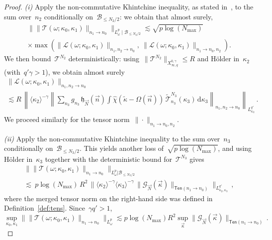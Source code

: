\documentclass[11pt,reqno,english]{amsart}
\numberwithin{equation}{section}
\theoremstyle{plain}
\theoremstyle{definition}
\theoremstyle{remark}
\begin{document}
\begin{proof}
	\emph{(i)} Apply the non-commutative Khintchine inequality, as stated in~\cite[(1.1)]{Kan25}, to the sum over~$n_{2}$ conditionally on~$\mathcal{B}_{\leq N_{2}/2}$: we obtain that almost surely,
	\begin{multline*}
		\Big\|
		\|\mathcal{T}(\omega;\kappa_{0},\kappa_{1})\|_{n_{1}\to n_0}
		\Big\|_{L^{p}_{\omega}\mid \mathcal{B}_{\leq N_{2}/2}}
		\lesssim
		\sqrt{p\log(N_{\mathrm{max}})}\,
		\\
		\times\max
		\left(
		\|\mathcal{L}(\omega;\kappa_{0},\kappa_{1})\|_{n_{1},n_{2}\to n_{0}},\
		\|\mathcal{L}(\omega;\kappa_{0},\kappa_{1})\|_{n_{1}\to n_{0},n_{2}}
		\right).
	\end{multline*}
	We then bound~$\mathcal{T}^{N_{2}}$ deterministically: using~$\|\mathcal{T}^{N_{2}}\|_{X^{0,\gamma}_{\infty,q}}\le R$ and Hölder in~$\kappa_{2}$ (with~$q'\gamma>1$), we obtain almost surely
	\begin{multline*}
		\|\mathcal{L}(\omega;\kappa_{0},\kappa_{1})\|_{n_{1},n_{2}\to n_{0}}
		\\
		\lesssim
		R\,
		\left\|
		\langle\kappa_{2}\rangle^{-\gamma}
		\left\|
		\sum_{n_{3}} g_{n_{3}}\,
		\mathfrak{h}_{\vec{N}}(\vec n)
		\int
		\widehat{\chi}(\widetilde{\kappa}-\Omega(\vec n))\,
		\widetilde{\mathcal{T}}_{n_{3}}^{N_{3}}(\kappa_{3})\,
		\mathrm{d}\kappa_{3}
		\right\|_{n_{1},n_{2}\to n_{0}}
		\right\|_{L^{q'}_{\kappa_{2}}}\,.
	\end{multline*}
	We proceed similarly for the tensor norm~$\|\cdot\|_{n_{1}\to n_{0},n_{2}}$.

	\emph{(ii)} Apply the non-commutative Khintchine inequality to the sum over~$n_{3}$ conditionally on~$\mathcal{B}_{\leq N_{3}/2}$.
	This yields another loss of~$\sqrt{p\log(N_{\max})}$, and using Hölder in~$\kappa_{3}$ together with the deterministic bound for~$\mathcal{T}^{N_{3}}$ gives
	\begin{multline*}
		\|\|\mathcal{T}(\omega;\kappa_{0},\kappa_{1})\|_{n_{1}\to n_{0}}
		\|_{L_{\omega}^{p}|\mathcal{B}_{\leq N_3/2}}
		\\
		\lesssim\ p\log(N_{\mathrm{max}})\,R^{2}\,
		\|
		\langle\kappa_{2}\rangle^{-\gamma}
		\langle\kappa_{3}\rangle^{-\gamma}\,
		\|\mathcal{G}_{\vec{N}}(\vec{\kappa})\|_{\mathsf{Ten}(n_{1}\to n_{0})}
		\|_{L_{\kappa_{2},\kappa_{3}}^{q'}}\,,
	\end{multline*}
	where the merged tensor norm on the right-hand side was defined in Definition~\ref{def:tens}. Since~$\gamma q'>1$,
	\begin{equation}
		\label{eq:pmoment-pre}
		\sup_{\kappa_{0},\kappa_{1}}
		\|\|\mathcal{T}(\omega;\kappa_{0},\kappa_{1})\|_{n_{1}\to n_{0}}
		\|_{L_{\omega}^{p}}
		\lesssim
		p\log(N_{\mathrm{max}})R^{2}
		\sup_{\vec{\kappa}}
		\|\mathcal{G}_{\vec{N}}(\vec{\kappa})\|_{\mathsf{Ten}(n_{1}\to n_{0})}\,.
	\end{equation}


\end{proof}
\end{document}
